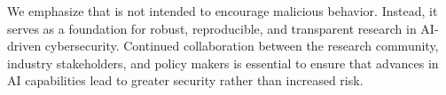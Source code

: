 We emphasize that \sysname is not intended to encourage malicious behavior. Instead, it serves as a foundation for robust, reproducible, and transparent research in AI-driven cybersecurity. Continued collaboration between the research community, industry stakeholders, and policy makers is essential to ensure that advances in AI capabilities lead to greater security rather than increased risk.
